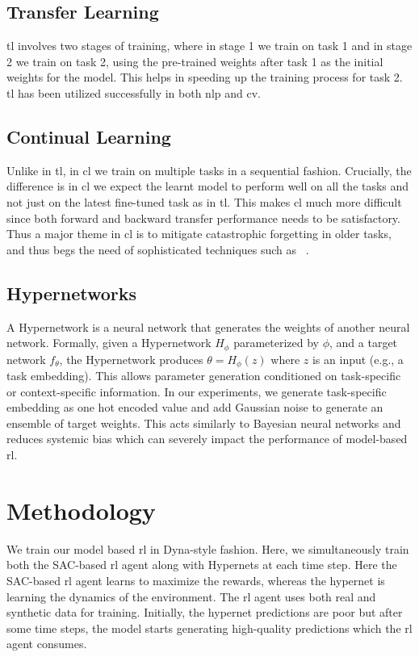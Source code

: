 \documentclass{article}
\begin{document}
\subsection{ Transfer Learning}
\gls{tl} involves two stages of training, where in stage 1 we train on task 1 and in stage 2 we train on task 2, using the pre-trained weights after task 1 as the initial weights for the model. 
This helps in speeding up the training process for task 2. \gls{tl} has been utilized successfully in both \gls{nlp} and \gls{cv}. 


\subsection{ Continual Learning}
Unlike in \gls{tl}, in \gls{cl} \cite{Wang} we train on multiple tasks in a sequential fashion. Crucially, the difference is in \gls{cl} we expect the learnt model to perform well on all the tasks and not just on the latest fine-tuned task as in \gls{tl}. This makes \gls{cl} much more difficult since both forward and backward transfer performance needs to be satisfactory.
Thus a major theme in \gls{cl} is to mitigate catastrophic forgetting in older tasks, and thus begs the need of sophisticated techniques such as ~\cite{Rolnick}.

\subsection{Hypernetworks}

A Hypernetwork \cite{Chauhan} is a neural network that generates the weights of another neural network. Formally, given a Hypernetwork \( H_\phi \) parameterized by \( \phi \), and a target network \( f_\theta \), the Hypernetwork produces \( \theta = H_\phi(z) \) where \( z \) is an input (e.g., a task embedding). This allows parameter generation conditioned on task-specific or context-specific information.
In our experiments, we generate task-specific embedding as one hot encoded value and add Gaussian noise to generate an ensemble of target weights. This acts similarly to Bayesian neural networks and reduces systemic bias which can severely impact the performance of model-based \gls{rl}.




\section{Methodology}
We train our model based \gls{rl} in Dyna-style fashion. Here, we simultaneously train both the SAC-based \gls{rl} agent along with Hypernets at each time step.
Here the SAC-based \gls{rl} agent learns to maximize the rewards, whereas the hypernet is learning the dynamics of the environment.
The \gls{rl} agent uses both real and synthetic data for training. Initially, the hypernet predictions are poor but after some time steps, the model starts generating high-quality predictions which the \gls{rl} agent consumes.
\end{document}
